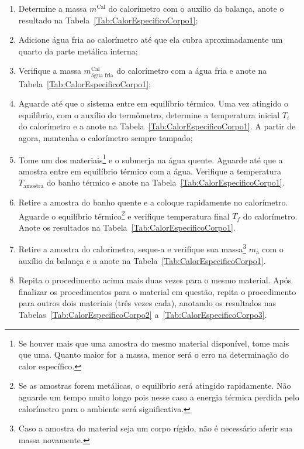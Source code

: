\begin{enumerate}
	\item Determine a massa $m^{\text{Cal}}$ do calorímetro com o auxílio da balança, anote o resultado na Tabela~\ref{Tab:CalorEspecificoCorpo1};
	\item Adicione água fria ao calorímetro até que ela cubra aproximadamente um quarto da parte metálica interna;
	\item Verifique a massa $m^{\text{Cal}}_{\text{água fria}}$ do calorímetro com a água fria e anote na Tabela~\ref{Tab:CalorEspecificoCorpo1};
	\item Aguarde até que o sistema entre em equilíbrio térmico. Uma vez atingido o equilíbrio, com o auxílio do termômetro, determine a temperatura inicial $T_i$ do calorímetro e a anote na Tabela~\ref{Tab:CalorEspecificoCorpo1}. A partir de agora, mantenha o calorímetro sempre tampado;
	\item Tome um dos materiais\footnote{Se houver mais que uma amostra do mesmo material disponível, tome mais que uma. Quanto maior for a massa, menor será o erro na determinação do calor específico.} e o submerja na água quente. Aguarde até que a amostra entre em equilíbrio térmico com a água. Verifique a temperatura $T_{\text{amostra}}$ do banho térmico e anote na Tabela~\ref{Tab:CalorEspecificoCorpo1}.
	\item Retire a amostra do banho quente e a coloque rapidamente no calorímetro. Aguarde o equilíbrio térmico\footnote{Se as amostras forem metálicas, o equilíbrio será atingido rapidamente. Não aguarde um tempo muito longo pois nesse caso a energia térmica perdida pelo calorímetro para o ambiente será significativa.} e verifique temperatura final $T_f$ do calorímetro. Anote os resultados na Tabela~\ref{Tab:CalorEspecificoCorpo1}.
	\item Retire a amostra do calorímetro, seque-a e verifique sua massa\footnote{Caso a amostra do material seja um corpo rígido, não é necessário aferir sua massa novamente.} $m_{\text{a}}$ com o auxílio da balança e a anote na Tabela~\ref{Tab:CalorEspecificoCorpo1}.
	\item Repita o procedimento acima mais duas vezes para o mesmo material. Após finalizar os procedimentos para o material em questão, repita o procedimento para outros dois materiais (três vezes cada), anotando os resultados nas Tabelas~\ref{Tab:CalorEspecificoCorpo2} a~\ref{Tab:CalorEspecificoCorpo3}.
\end{enumerate}

\cleardoublepage

